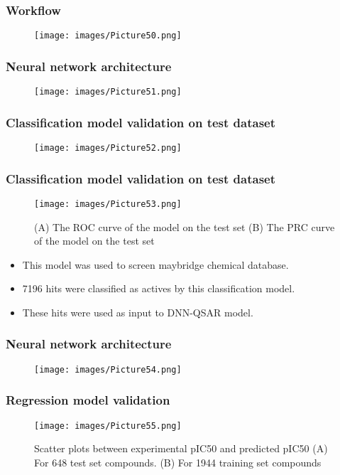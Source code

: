 \documentclass{beamer}
\begin{document}
\begin{frame}
\frametitle{\textbf{Workflow}}
\begin{figure}
\texttt{[image: images/Picture50.png]}
\end{figure}
\end{frame}

\begin{frame}
\frametitle{\textbf{Neural network architecture}}
\begin{figure}
\texttt{[image: images/Picture51.png]}
\end{figure}
\end{frame}

\begin{frame}
\frametitle{\textbf{Classification model validation on test dataset}}
\begin{figure}
\texttt{[image: images/Picture52.png]}
\end{figure}
\end{frame}

\begin{frame}
\frametitle{\textbf{Classification model validation on test dataset}}
\begin{figure}
\texttt{[image: images/Picture53.png]}
\caption{(A) The ROC curve of the model on the test set (B) The PRC curve of the model on the test set}
\end{figure}
\begin{itemize}
\item This model was used to screen maybridge chemical database.
\item 7196 hits were classified as actives by this classification model.
\item These hits were used as input to DNN-QSAR model.
\end{itemize}
\end{frame}

\begin{frame}
\frametitle{\textbf{Neural network architecture}}
\begin{figure}
\texttt{[image: images/Picture54.png]}
\end{figure}
\end{frame}

\begin{frame}
\frametitle{\textbf{Regression model validation}}
\begin{figure}
\texttt{[image: images/Picture55.png]}
\caption{Scatter plots between experimental pIC50 and predicted pIC50 (A) For 648 test set compounds. (B) For 1944 training set compounds}
\end{figure}
\end{frame}
\end{document}
